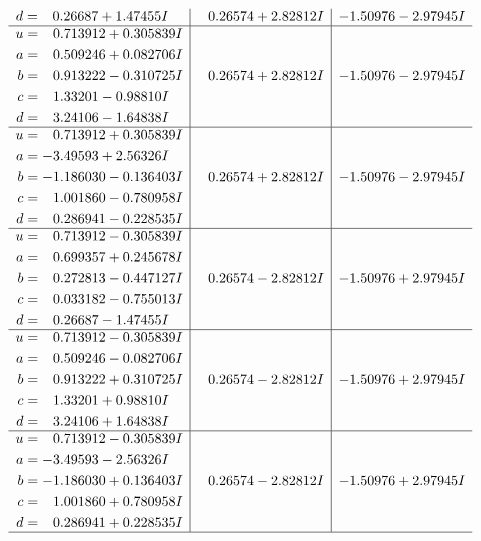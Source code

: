 \documentclass[1p]{elsarticle_modified}
\theoremstyle{definition}
\begin{document}
$$\begin{array}{c|c|c}
\begin{aligned}
d &= \phantom{-}0.26687 + 1.47455 I\end{aligned}
 & \phantom{-}0.26574 + 2.82812 I & -1.50976 - 2.97945 I \\ \hline\begin{aligned}
u &= \phantom{-}0.713912 + 0.305839 I \\
a &= \phantom{-}0.509246 + 0.082706 I \\
b &= \phantom{-}0.913222 - 0.310725 I \\
c &= \phantom{-}1.33201 - 0.98810 I \\
d &= \phantom{-}3.24106 - 1.64838 I\end{aligned}
 & \phantom{-}0.26574 + 2.82812 I & -1.50976 - 2.97945 I \\ \hline\begin{aligned}
u &= \phantom{-}0.713912 + 0.305839 I \\
a &= -3.49593 + 2.56326 I \\
b &= -1.186030 - 0.136403 I \\
c &= \phantom{-}1.001860 - 0.780958 I \\
d &= \phantom{-}0.286941 - 0.228535 I\end{aligned}
 & \phantom{-}0.26574 + 2.82812 I & -1.50976 - 2.97945 I \\ \hline\begin{aligned}
u &= \phantom{-}0.713912 - 0.305839 I \\
a &= \phantom{-}0.699357 + 0.245678 I \\
b &= \phantom{-}0.272813 - 0.447127 I \\
c &= \phantom{-}0.033182 - 0.755013 I \\
d &= \phantom{-}0.26687 - 1.47455 I\end{aligned}
 & \phantom{-}0.26574 - 2.82812 I & -1.50976 + 2.97945 I \\ \hline\begin{aligned}
u &= \phantom{-}0.713912 - 0.305839 I \\
a &= \phantom{-}0.509246 - 0.082706 I \\
b &= \phantom{-}0.913222 + 0.310725 I \\
c &= \phantom{-}1.33201 + 0.98810 I \\
d &= \phantom{-}3.24106 + 1.64838 I\end{aligned}
 & \phantom{-}0.26574 - 2.82812 I & -1.50976 + 2.97945 I \\ \hline\begin{aligned}
u &= \phantom{-}0.713912 - 0.305839 I \\
a &= -3.49593 - 2.56326 I \\
b &= -1.186030 + 0.136403 I \\
c &= \phantom{-}1.001860 + 0.780958 I \\
d &= \phantom{-}0.286941 + 0.228535 I\end{aligned}
 & \phantom{-}0.26574 - 2.82812 I & -1.50976 + 2.97945 I\\
 \hline 
 \end{array}$$\newpage\newpage\renewcommand{\arraystretch}{1}
\end{document}

